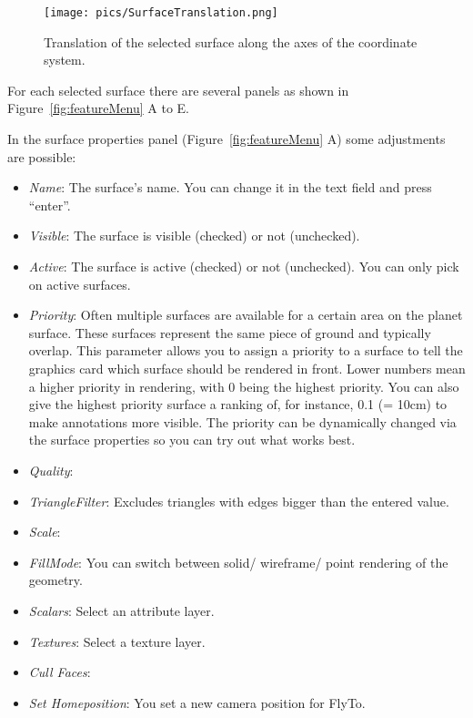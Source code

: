 \begin{figure}[h]
    	\centering
    		\texttt{[image: pics/SurfaceTranslation.png]}
    	\caption[Surface Translation]{Translation of the selected surface along the axes of the coordinate system.}
    	\label{fig:surfaceTranslation}
   \end{figure}

For each selected surface there are several panels as shown in Figure~\ref{fig:featureMenu} A to E. 

In the surface properties panel (Figure~\ref{fig:featureMenu} A) some adjustments are possible:
\begin{itemize}
	\item \textit{Name}: The surface's name. You can change it in the text field and press ``enter''.
	\item \textit{Visible}: The surface is visible (checked) or not (unchecked).
	\item \textit{Active}: The surface is active (checked) or not (unchecked). You can only pick on active surfaces.
	\item \textit{Priority}:  Often multiple surfaces are available for a certain area on the planet surface. These surfaces represent the same piece of ground and typically overlap. This parameter allows you to assign a priority to a surface to tell the graphics card which surface should be rendered in front. Lower numbers mean a higher priority in rendering, with 0 being the highest priority. You can also give the highest priority surface a ranking of, for instance, 0.1 (= 10cm) to make annotations more visible. The priority can be dynamically changed via the surface properties so you can try out what works best.
	\item \textit{Quality}: 
	\item \textit{TriangleFilter}: Excludes triangles with edges bigger than the entered value.
	\item \textit{Scale}: 
	\item \textit{FillMode}: You can switch between solid/ wireframe/ point rendering of the geometry.
	\item \textit{Scalars}: Select an attribute layer.
	\item \textit{Textures}: Select a texture layer.
	\item \textit{Cull Faces}:
	\item \textit{Set Homeposition}: You set a new camera position for FlyTo.
\end{itemize}

